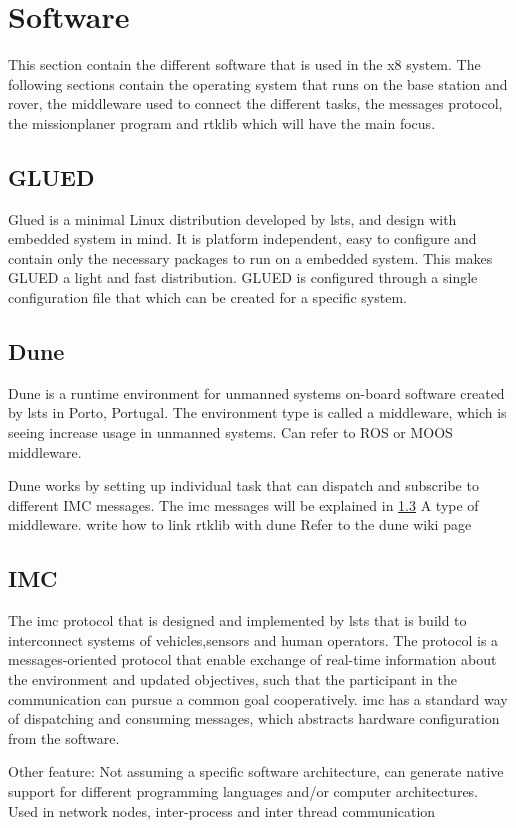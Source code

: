 \section{Software}
This section contain the different software that is used in the x8 system. The following sections contain the operating system that runs on the base station and rover, the middleware used to connect the different tasks, the messages protocol, the missionplaner program and rtklib which will have the main focus.\subsection{GLUED}
Glued is a minimal Linux distribution developed by \gls{lsts}, and design with embedded system in mind. It is platform independent, easy to configure and contain only the necessary packages to run on a embedded system. This makes GLUED a light and fast distribution. GLUED is configured through a single configuration file that which can be created for a specific system. 
\subsection{Dune}
Dune is a runtime environment for unmanned systems on-board software created by \gls{lsts} in Porto, Portugal. The environment type is called a middleware, which is seeing increase usage in unmanned systems. Can refer to ROS or MOOS middleware.

Dune works by setting up individual task that can dispatch and subscribe to different IMC messages. The \gls{imc} messages will be explained in \ref{ss:IMC}
A type of middleware. write how to link rtklib with dune
Refer to the dune wiki page
\subsection{IMC}\label{ss:IMC}
The \gls{imc} protocol that is designed and implemented by \gls{lsts} that is build to interconnect systems of vehicles,sensors and human operators. The protocol is a messages-oriented protocol that enable exchange of real-time information about the environment and updated objectives, such that the participant in the communication can pursue a common goal cooperatively.
\gls{imc} has a standard way of dispatching and consuming messages, which abstracts hardware configuration from the software.

Other feature: Not assuming a specific software architecture, can generate native support for different programming languages and/or computer architectures. Used in network nodes, inter-process and inter thread communication
